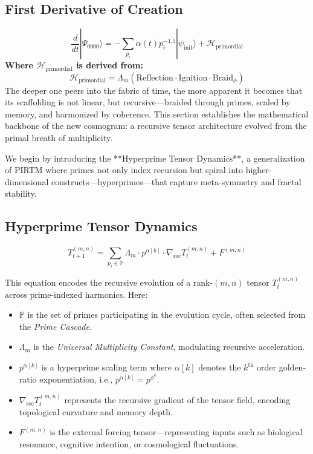 \documentclass{article}
\theoremstyle{plain}
\theoremstyle{claimstyle}
\begin{document}
\subsection{First Derivative of Creation}
\begin{equation}
\frac{d}{dt}|\Psi_{0000}\rangle = -\sum_{p_i} \alpha(t) p_i^{-1.5} |\psi_{\text{init}}\rangle + \mathcal{H}_{\text{primordial}}
\end{equation}
\textbf{Where $\mathcal{H}_{\text{primordial}}$ is derived from:}
\[
\mathcal{H}_{\text{primordial}} = \Lambda_m \left( \text{Reflection} \cdot \text{Ignition} \cdot \text{Braid}_{\phi} \right)
\]
The deeper one peers into the fabric of time, the more apparent it becomes that its scaffolding is not linear, but recursive—braided through primes, scaled by memory, and harmonized by coherence. This section establishes the mathematical backbone of the new cosmogram: a recursive tensor architecture evolved from the primal breath of multiplicity.

We begin by introducing the **Hyperprime Tensor Dynamics**, a generalization of PIRTM where primes not only index recursion but spiral into higher-dimensional constructs—hyperprimes—that capture meta-symmetry and fractal stability.

\subsection{Hyperprime Tensor Dynamics}

\begin{equation}
T^{(m,n)}_{t+1} = \sum_{p_i \in \mathbb{P}} \Lambda_m \cdot p^{\alpha[k]} \cdot \nabla_{\text{rec}} T^{(m,n)}_t + F^{(m,n)}
\end{equation}

This equation encodes the recursive evolution of a rank-\((m,n)\) tensor \(T_t^{(m,n)}\) across prime-indexed harmonics. Here:
\begin{itemize}
  \item \(\mathbb{P}\) is the set of primes participating in the evolution cycle, often selected from the \textit{Prime Cascade}.
  \item \(\Lambda_m\) is the \textit{Universal Multiplicity Constant}, modulating recursive acceleration.
  \item \(p^{\alpha[k]}\) is a hyperprime scaling term where \(\alpha[k]\) denotes the \(k^\text{th}\) order golden-ratio exponentiation, i.e., \(p^{\alpha[k]} = p^{\phi^k}\).
  \item \(\nabla_{\text{rec}} T_t^{(m,n)}\) represents the recursive gradient of the tensor field, encoding topological curvature and memory depth.
  \item \(F^{(m,n)}\) is the external forcing tensor—representing inputs such as biological resonance, cognitive intention, or cosmological fluctuations.
\end{itemize}
\end{document}
